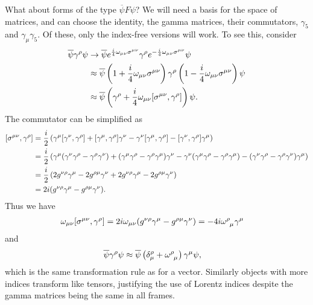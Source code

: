 What about forms of the type $\overline{\psi}F\psi$? We will need a basis for the space of matrices, and can choose the identity, the gamma matrices, their commutators, $\gamma_{5}$ and $\gamma_{\mu}\gamma_{5}$. Of these, only the index-free versions will work. To see this, consider
\begin{align*}
	\overline{\psi}\gamma^{\rho}\psi &\to \overline{\psi}e^{\frac{i}{4}\omega_{\mu\nu}\sigma^{\mu\nu}}\gamma^{\rho}e^{-\frac{i}{4}\omega_{\mu\nu}\sigma^{\mu\nu}}\psi \\
	                                &\approx \overline{\psi}\left(1 + \frac{i}{4}\omega_{\mu\nu}\sigma^{\mu\nu}\right)\gamma^{\rho}\left(1 - \frac{i}{4}\omega_{\mu\nu}\sigma^{\mu\nu}\right)\psi \\
	                                &\approx \overline{\psi}\left(\gamma^{\rho} + \frac{i}{4}\omega_{\mu\nu}\comm{\sigma^{\mu\nu}}{\gamma^{\rho}}\right)\psi.
\end{align*}
The commutator can be simplified as
\begin{align*}
	\comm{\sigma^{\mu\nu}}{\gamma^{\rho}} &= \frac{i}{2}\left(\gamma^{\mu}\comm{\gamma^{\nu}}{\gamma^{\rho}} + \comm{\gamma^{\mu}}{\gamma^{\rho}}\gamma^{\nu} - \gamma^{\nu}\comm{\gamma^{\mu}}{\gamma^{\rho}} - \comm{\gamma^{\nu}}{\gamma^{\rho}}\gamma^{\mu}\right) \\
	                                         &= \frac{i}{2}\left(\gamma^{\mu}(\gamma^{\nu}\gamma^{\rho} - \gamma^{\rho}\gamma^{\nu}) + (\gamma^{\mu}\gamma^{\rho} - \gamma^{\rho}\gamma^{\mu})\gamma^{\nu} - \gamma^{\nu}(\gamma^{\mu}\gamma^{\rho} - \gamma^{\rho}\gamma^{\mu}) - (\gamma^{\nu}\gamma^{\rho} - \gamma^{\rho}\gamma^{\nu})\gamma^{\mu}\right) \\
	                                         &= \frac{i}{2}\left(2g^{\nu\rho}\gamma^{\mu} - 2g^{\rho\mu}\gamma^{\nu} + 2g^{\nu\rho}\gamma^{\mu} - 2g^{\rho\mu}\gamma^{\nu}\right) \\
	                                         &= 2i(g^{\nu\rho}\gamma^{\mu} - g^{\rho\mu}\gamma^{\nu}).
\end{align*}
Thus we have
\begin{align*}
	\omega_{\mu\nu}\comm{\sigma^{\mu\nu}}{\gamma^{\rho}} &= 2i\omega_{\mu\nu}(g^{\nu\rho}\gamma^{\mu} - g^{\rho\mu}\gamma^{\nu}) = -4i\tensor{\omega}{^{\rho}_{\mu}}\gamma^{\mu}
\end{align*}
and
\begin{align*}
	\overline{\psi}\gamma^{\rho}\psi &\approx \overline{\psi}\left(\kdelta{\rho}{\mu} + \tensor{\omega}{^{\rho}_{\mu}}\right)\gamma^{\mu}\psi,
\end{align*}
which is the same transformation rule as for a vector. Similarly objects with more indices transform like tensors, justifying the use of Lorentz indices despite the gamma matrices being the same in all frames.

